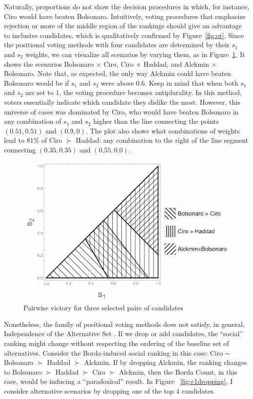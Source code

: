 \documentclass[hidelinks,11pt]{article} \usepackage[utf8]{inputenc}
\begin{document}
Naturally, proportions do not show the decision procedures in which, for instance, Ciro would have beaten Bolsonaro. Intuitively, voting procedures that emphasize rejection or more of the middle region of the rankings should give an advantage to inclusive candidates, which is qualitatively confirmed by Figure~\ref{fig:ot}. Since the positional voting methods with four candidates are determined by their \(s_{1}\) and \(s_{2}\) weights, we can visualize all scenarios by varying them, as in Figure~\ref{fig:positional4c}. It shows the scenarios Bolsonaro \(\times\) Ciro, Ciro \(\times \) Haddad, and Alckmin \(\times\) Bolsonaro. Note that, as expected, the only way Alckmin could have beaten Bolsonaro would be if \(s_{1}\) and \(s_{2}\) were above 0.6. Keep in mind that when both \(s_{1}\) and \(s_{2}\) are set to 1, the voting procedure becomes antiplurality. In this method, voters essentially indicate which candidate they dislike the most. However, this universe of cases was dominated by Ciro, who would have beaten Bolsonaro in any combination of \(s_{1}\) and \(s_{2}\) higher than the line connecting the points \((0.51,0.51)\) and \((0.9,0)\). The plot also shows what combinations of weights lead to \(81\%\) of Ciro \(\succ\) Haddad: any combination to the right of the line segment connecting \((0.35,0.35)\) and \((0.55,0.0)\).

\begin{figure}[!h] \centering \includegraphics[width=\columnwidth,
height=0.3\textheight]{./images/counterfactual_triangle.jpg}
\caption{Pairwise victory for three selected pairs of candidates}
 \label{fig:positional4c}
\end{figure}


Nonetheless, the family of positional voting methods does not satisfy, in general, Independence of the Alternative Set \parencite{kaminski2015empirical}. If we drop or add candidates, the ``social'' ranking might change without respecting the ordering of the baseline set of alternatives. Consider the Borda-induced social ranking in this case: Ciro \( \sim \) Bolsonaro \(\succ\) Haddad \(\succ\) Alckmin. If by dropping Alckmin, the ranking changes to Bolsonaro \(\succ\) Haddad \(\succ\) Ciro \(\succ\) Alckmin, then the Borda Count, in this case, would be inducing a ``paradoxical'' result. In Figure ~\ref{fig:c1dropping}, I consider alternative scenarios by dropping one of the top 4 candidates.
\end{document}

